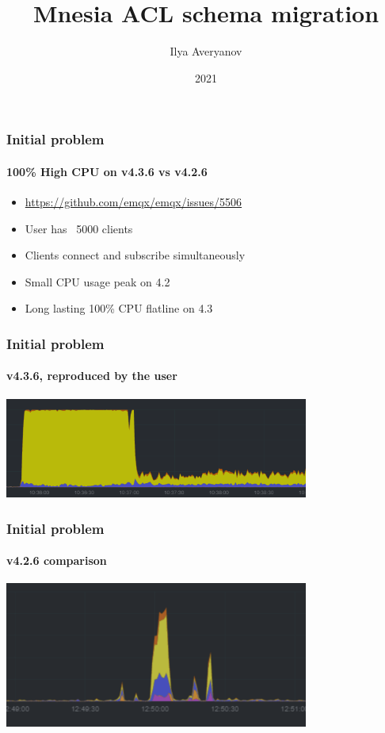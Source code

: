 \documentclass{beamer}
\title{Mnesia ACL schema migration}
\author{Ilya Averyanov}
\institute{EMQX}
\date{2021}
\begin{document}
\frame{\titlepage}

\begin{frame}
    \frametitle{Initial problem}
    \framesubtitle{100\% High CPU on v4.3.6 vs v4.2.6}

    \begin{itemize}
        \item \href{https://github.com/emqx/emqx/issues/5506}{https://github.com/emqx/emqx/issues/5506}
        \item User has ~5000 clients
        \item Clients connect and subscribe simultaneously
        \item Small CPU usage peak on 4.2
        \item Long lasting 100\% CPU flatline on 4.3
    \end{itemize}
\end{frame}

\begin{frame}
    \frametitle{Initial problem}
    \framesubtitle{v4.3.6, reproduced by the user}

    \begin{center}
        \includegraphics[width=10cm, keepaspectratio]{images/initial-4.3.png}
    \end{center}
\end{frame}

\begin{frame}
    \frametitle{Initial problem}
    \framesubtitle{v4.2.6 comparison}

    \begin{center}
        \includegraphics[width=10cm, keepaspectratio]{images/initial-4.2.png}
    \end{center}
\end{frame}
\end{document}
